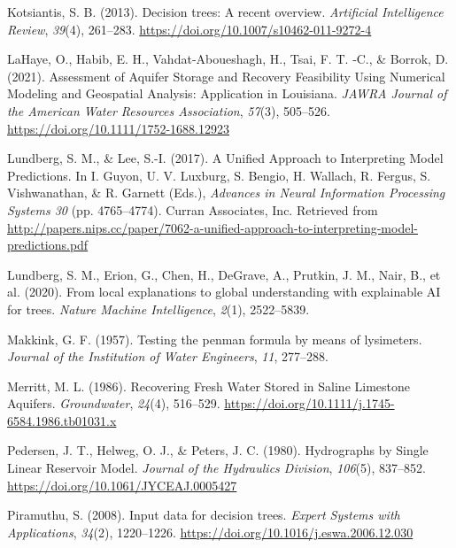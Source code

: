 \documentclass[
]{agujournal2019}
\newlength{\cslhangindent}
\newenvironment{CSLReferences}[2] %
 {\begin{list}{}{%
  \setlength{\itemindent}{0pt}
  \setlength{\leftmargin}{0pt}
  \setlength{\parsep}{0pt}
  \ifodd #1
   \setlength{\leftmargin}{\cslhangindent}
   \setlength{\itemindent}{-1\cslhangindent}
  \fi
  \setlength{\itemsep}{#2\baselineskip}}}
 {\end{list}}
\begin{document}
\begin{CSLReferences}{1}{0}
Kotsiantis, S. B. (2013). Decision trees: A recent overview.
\emph{Artificial Intelligence Review}, \emph{39}(4), 261--283.
\url{https://doi.org/10.1007/s10462-011-9272-4}

LaHaye, O., Habib, E. H., Vahdat‐Aboueshagh, H., Tsai, F. T. ‐C., \&
Borrok, D. (2021). Assessment of {Aquifer} {Storage} and {Recovery}
{Feasibility} {Using} {Numerical} {Modeling} and {Geospatial}
{Analysis}: {Application} in {Louisiana}. \emph{JAWRA Journal of the
American Water Resources Association}, \emph{57}(3), 505--526.
\url{https://doi.org/10.1111/1752-1688.12923}

Lundberg, S. M., \& Lee, S.-I. (2017). A {Unified} {Approach} to
{Interpreting} {Model} {Predictions}. In I. Guyon, U. V. Luxburg, S.
Bengio, H. Wallach, R. Fergus, S. Vishwanathan, \& R. Garnett (Eds.),
\emph{Advances in {Neural} {Information} {Processing} {Systems} 30} (pp.
4765--4774). Curran Associates, Inc. Retrieved from
\url{http://papers.nips.cc/paper/7062-a-unified-approach-to-interpreting-model-predictions.pdf}

Lundberg, S. M., Erion, G., Chen, H., DeGrave, A., Prutkin, J. M., Nair,
B., et al. (2020). From local explanations to global understanding with
explainable {AI} for trees. \emph{Nature Machine Intelligence},
\emph{2}(1), 2522--5839.

Makkink, G. F. (1957). Testing the penman formula by means of
lysimeters. \emph{Journal of the Institution of Water Engineers},
\emph{11}, 277--288.

Merritt, M. L. (1986). Recovering Fresh Water Stored in Saline Limestone
Aquifers. \emph{Groundwater}, \emph{24}(4), 516--529.
\url{https://doi.org/10.1111/j.1745-6584.1986.tb01031.x}

Pedersen, J. T., Helweg, O. J., \& Peters, J. C. (1980). Hydrographs by
{Single} {Linear} {Reservoir} {Model}. \emph{Journal of the Hydraulics
Division}, \emph{106}(5), 837--852.
\url{https://doi.org/10.1061/JYCEAJ.0005427}

Piramuthu, S. (2008). Input data for decision trees. \emph{Expert
Systems with Applications}, \emph{34}(2), 1220--1226.
\url{https://doi.org/10.1016/j.eswa.2006.12.030}


\end{CSLReferences}
\end{document}
